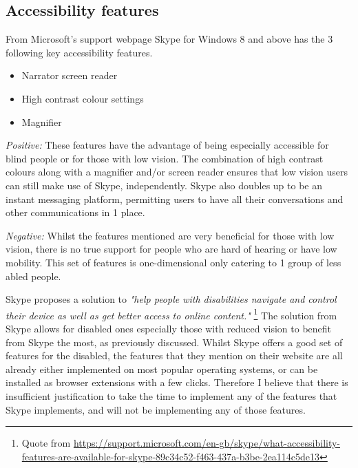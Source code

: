 \subsection*{Accessibility features}

From Microsoft's support webpage Skype for
Windows 8 and above has the 3 following key accessibility
features.

\begin{itemize}
  \item Narrator screen reader
  \item High contrast colour settings
  \item Magnifier
\end{itemize}

\textit{Positive:}
These features have the advantage of being especially
accessible for blind people or for those with low vision. The
combination of high contrast colours along with a magnifier
and/or screen reader ensures that low vision users can still
make use of Skype, independently. Skype also doubles up to be
an instant messaging platform, permitting users to have all
their conversations and other communications in 1 place.

\vspace{0.2cm}

\textit{Negative:}
Whilst the features mentioned are very beneficial for those
with low vision, there is no true support for people who are
hard of hearing or have low mobility. This set of features is
one-dimensional only catering to 1 group of less abled people.

\vspace{0.2cm}

Skype proposes a solution to \textit{"help people with
disabilities navigate and control their device as well as get
better access to online content."}
\footnote{Quote from
\url{https://support.microsoft.com/en-gb/skype/what-accessibility-features-are-available-for-skype-89c34c52-f463-437a-b3be-2ea114c5de13}}
The solution from Skype allows for disabled ones especially
those with reduced vision to benefit from Skype the most, as
previously discussed. Whilst Skype offers a good set of
features for the disabled, the features that they mention on
their website are all already either implemented on most
popular operating systems, or can be installed as browser
extensions with a few clicks. Therefore I believe that there is
insufficient justification to take the time to implement any
of the features that Skype implements, and will not be
implementing any of those features.

